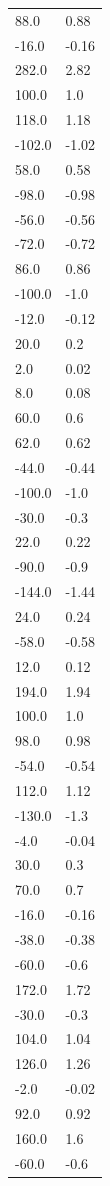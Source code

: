 \begin{longtable}{ll}
88.0 & 0.88 \\
-16.0 & -0.16 \\
282.0 & 2.82 \\
100.0 & 1.0 \\
118.0 & 1.18 \\
-102.0 & -1.02 \\
58.0 & 0.58 \\
-98.0 & -0.98 \\
-56.0 & -0.56 \\
-72.0 & -0.72 \\
86.0 & 0.86 \\
-100.0 & -1.0 \\
-12.0 & -0.12 \\
20.0 & 0.2 \\
2.0 & 0.02 \\
8.0 & 0.08 \\
60.0 & 0.6 \\
62.0 & 0.62 \\
-44.0 & -0.44 \\
-100.0 & -1.0 \\
-30.0 & -0.3 \\
22.0 & 0.22 \\
-90.0 & -0.9 \\
-144.0 & -1.44 \\
24.0 & 0.24 \\
-58.0 & -0.58 \\
12.0 & 0.12 \\
194.0 & 1.94 \\
100.0 & 1.0 \\
98.0 & 0.98 \\
-54.0 & -0.54 \\
112.0 & 1.12 \\
-130.0 & -1.3 \\
-4.0 & -0.04 \\
30.0 & 0.3 \\
70.0 & 0.7 \\
-16.0 & -0.16 \\
-38.0 & -0.38 \\
-60.0 & -0.6 \\
172.0 & 1.72 \\
-30.0 & -0.3 \\
104.0 & 1.04 \\
126.0 & 1.26 \\
-2.0 & -0.02 \\
92.0 & 0.92 \\
160.0 & 1.6 \\
-60.0 & -0.6 \\

\end{longtable}
